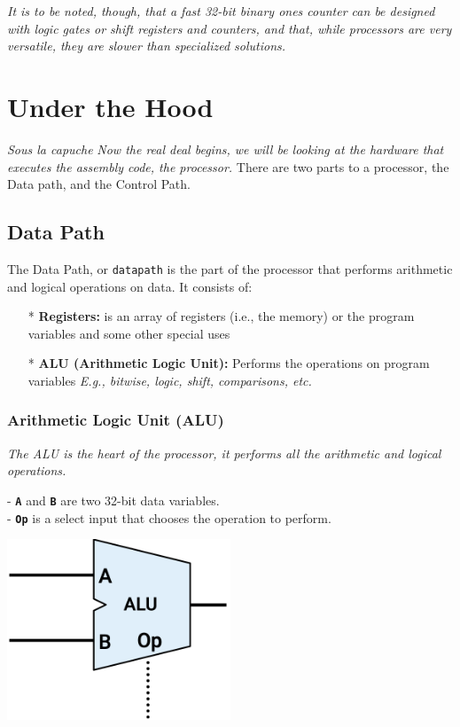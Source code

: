 \documentclass[12pt,openany]{book}
\begin{document}
\textit{It is to be noted, though, that a fast 32-bit binary ones counter can be designed with logic gates or shift registers and counters, and that, while processors are very versatile, they are slower than specialized solutions.}
\section{Under the Hood}
\textit{Sous la capuche}\newline 
\textit{Now the real deal begins, we will be looking at the hardware that executes the assembly code, the processor.}
\newline
There are two parts to a processor, the Data path, and the Control Path.
\subsection{Data Path}
The Data Path, or \texttt{datapath} is the part of the processor that performs arithmetic and logical operations on data. It consists of:
\begin{itemize}
	\item[*] \textbf{Registers:} is an array of registers (i.e., the memory) or the program variables and some other special uses
	\item[*] \textbf{ALU (Arithmetic Logic Unit):} Performs the operations on program variables \textit{E.g., bitwise, logic, shift, comparisons, etc.}
\end{itemize}

\subsubsection{Arithmetic Logic Unit (ALU)}

\textit{The ALU is the heart of the processor, it performs all the arithmetic and logical operations.}
\newline
\begin{minipage}[htp]{0.55\textwidth}
	- \texttt{\textbf{A}} and \texttt{\textbf{B}} are two 32-bit data variables. \\
	- \texttt{\textbf{Op}} is a select input that chooses the operation to perform. \\

\end{minipage}
\hfill
\vline
\hfill
\begin{minipage}[htp]{0.43\textwidth}
	\begin{center}
		\includegraphics[width=0.5\textwidth]{circuits/19.4.1.png}
	\end{center}
\end{minipage}
\end{document}
